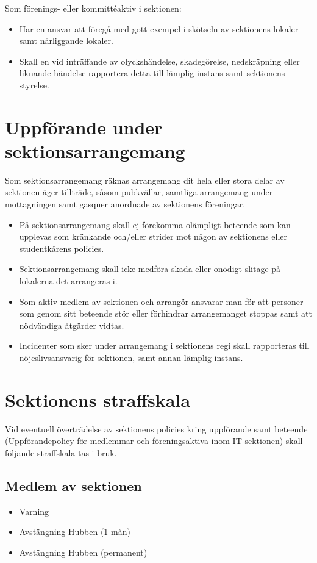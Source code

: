 \documentclass[11pt, includeaddress]{classes/cthit}
\begin{document}
Som förenings- eller kommittéaktiv i sektionen:

\begin{itemize}
	\item Har en ansvar att föregå med gott exempel i skötseln av sektionens lokaler samt närliggande lokaler.
	\item Skall en vid inträffande av olyckshändelse, skadegörelse, nedskräpning eller liknande händelse rapportera detta till lämplig instans samt sektionens styrelse.
	
\end{itemize}

\section{Uppförande under sektionsarrangemang}
Som sektionsarrangemang räknas arrangemang dit hela eller stora delar av sektionen äger tillträde,
såsom pubkvällar, samtliga arrangemang under mottagningen samt gasquer anordnade av sektionens
föreningar.

\begin{itemize}
	\item På sektionsarrangemang skall ej förekomma olämpligt beteende som kan upplevas som kränkande och/eller strider mot någon av sektionens eller studentkårens policies.
	\item Sektionsarrangemang skall icke medföra skada eller onödigt slitage på lokalerna det arrangeras i.
 	\item Som aktiv medlem av sektionen och arrangör ansvarar man för att personer som genom sitt beteende stör eller förhindrar arrangemanget stoppas samt att nödvändiga åtgärder vidtas.
	\item Incidenter som sker under arrangemang i sektionens regi skall rapporteras till nöjeslivsansvarig för sektionen, samt annan lämplig instans.

\end{itemize}

\section{Sektionens straffskala}
Vid eventuell överträdelse av sektionens policies kring uppförande samt beteende (Uppförandepolicy
för medlemmar och föreningsaktiva inom IT-sektionen) skall följande straffskala tas i bruk.

\subsection{Medlem av sektionen}
\begin{itemize}
	\item Varning
	\item Avstängning Hubben (1 mån)
 	\item Avstängning Hubben (permanent)
\end{itemize}
\end{document}
